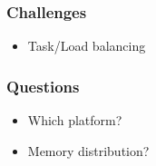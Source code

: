 \begin{frame}
\frametitle{Challenges}
\begin{itemize}
	\item Task/Load balancing
\end{itemize}
\end{frame}


\begin{frame}
\frametitle{Questions}
\begin{itemize}
	\item Which platform?
	\item Memory distribution?
\end{itemize}
\end{frame}


 
